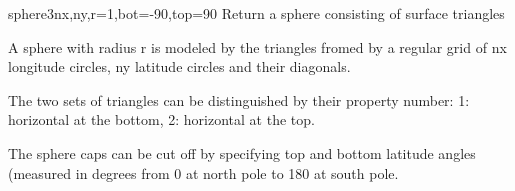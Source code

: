         
\begin{funcdesc}{sphere3}{nx,ny,r=1,bot=-90,top=90}
Return a sphere consisting of surface triangles

A sphere with radius r is modeled by the triangles fromed by a regular
grid of nx longitude circles, ny latitude circles and their diagonals.

The two sets of triangles can be distinguished by their property number:
1: horizontal at the bottom, 2: horizontal at the top.

The sphere caps can be cut off by specifying top and bottom latitude
angles (measured in degrees from 0 at north pole to 180 at south pole.
\end{funcdesc}

